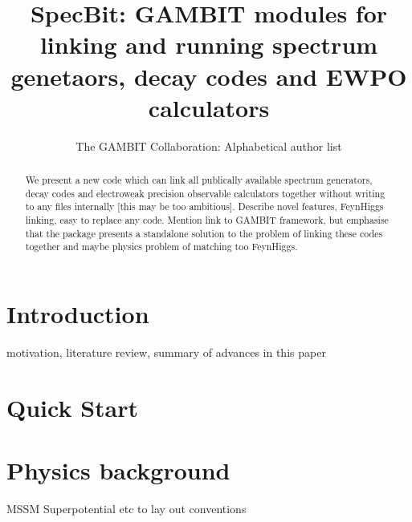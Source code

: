 \documentclass[11pt,a4paper]{article}
\title{SpecBit: GAMBIT modules for linking and running spectrum genetaors, decay codes and EWPO calculators}
\author{The GAMBIT Collaboration: Alphabetical author list} %
\begin{document}
\maketitle

\begin{abstract}
We present a new code which can link all publically available spectrum generators, decay codes and electroweak precision observable calculators together without writing to any files internally [this may be too ambitious]. Describe novel features, FeynHiggs linking, easy to replace any code. Mention link to GAMBIT framework, but emphasise that the package presents a standalone solution to the problem of linking these codes together and maybe physics problem of matching too FeynHiggs.
\end{abstract}

\tableofcontents


\section{Introduction}
motivation, literature review, summary of advances in this paper



\section{Quick Start}

\section{Physics background}
MSSM Superpotential etc to lay out conventions
\end{document}
